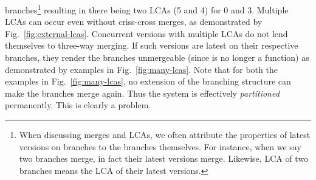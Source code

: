 branches\footnote{
  When discussing merges and LCAs, we often attribute the properties
  of latest versions on branches to the branches themselves.  For
  instance, when we say two branches merge, in fact their latest
  versions merge. Likewise, LCA of two branches means the LCA of their
  latest versions.
}
resulting in there being two LCAs (5 and 4) for 0 and 3. 
Multiple LCAs can occur even without criss-cross merges, as
demonstrated by Fig.~\ref{fig:external-lcas}. 
Concurrent versions with multiple LCAs do not lend themselves to
three-way merging. If such versions are latest on their respective
branches, they render the branches unmergeable (since   is no
longer a function) as demonstrated by examples in
Fig.~\ref{fig:many-lcas}. Note that for both the examples in
Fig.~\ref{fig:many-lcas}, no extension of the branching structure
can make the branches merge again. Thus the system is effectively
\emph{partitioned} permanently. This is clearly a problem. 

